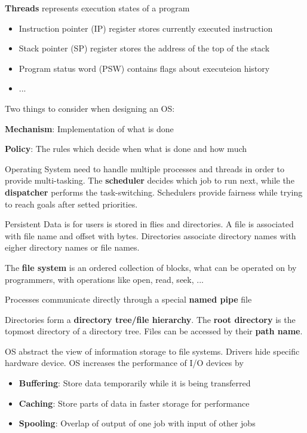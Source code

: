 \documentclass[11pt,a4paper]{article}
\begin{document}
	\textbf{Threads} represents execution states of a program
	\begin{itemize}
		\item Instruction pointer (IP) register stores currently executed instruction
		\item Stack pointer (SP) register stores the address of the top of the stack
		\item Program status word (PSW) contains flags about executeion history
		\item ...
	\end{itemize}
	
	Two things to consider when designing an OS:
	
	\textbf{Mechanism}: Implementation of what is done
	
	\textbf{Policy}: The rules which decide when what is done and how much \newline
	
	Operating System need to handle multiple processes and threads in order to provide multi-tasking. The \textbf{scheduler} decides which job to run next, while the \textbf{dispatcher} performs the task-switching. Schedulers provide fairness while trying to reach goals after setted priorities.\newline
	
	Persistent Data is for users is stored in flies and directories. A file is associated with file name and offset with bytes. Directories associate directory names with eigher directory names or file names.
	
	The \textbf{file system} is an ordered collection of blocks, what can be operated on by programmers, with operations like open, read, seek, ...
	
	Processes communicate directly through a special \textbf{named pipe} file
	
	Directories form a \textbf{directory tree/file hierarchy}. The \textbf{root directory} is the topmost directory of a directory tree. Files can be accessed by their \textbf{path name}. \newline
	
	OS abstract the view of information storage to file systems. Drivers hide specific hardware device. OS increases the performance of I/O devices by
	\begin{itemize}
		\item \textbf{Buffering}: Store data temporarily while it is being transferred
		\item \textbf{Caching}: Store parts of data in faster storage for performance
		\item \textbf{Spooling}: Overlap of output of one job with input of other jobs
	\end{itemize}
 	
\end{document}
